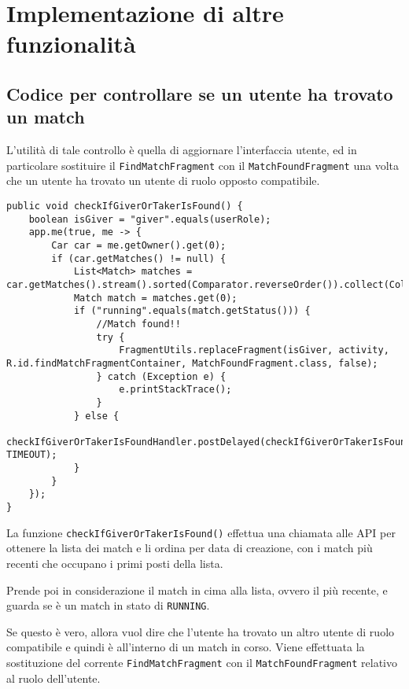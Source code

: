 \hypertarget{implementazione}{%
\chapter{Implementazione di altre funzionalità}\label{capitolo-3---implementazione}}

\hypertarget{codice-per-controllare-se-un-utente-ha-trovato-un-match}{%
\section{Codice per controllare se un utente ha trovato un
match}\label{codice-per-controllare-se-un-utente-ha-trovato-un-match}}

L'utilità di tale controllo è quella di aggiornare l'interfaccia utente,
ed in particolare sostituire il \texttt{FindMatchFragment} con il
\texttt{MatchFoundFragment} una volta che un utente ha trovato un utente di ruolo opposto compatibile.

\begin{lstlisting}[caption=Controllo per vedere se l'utente è in un match o meno]
public void checkIfGiverOrTakerIsFound() {
    boolean isGiver = "giver".equals(userRole);
    app.me(true, me -> {
        Car car = me.getOwner().get(0);
        if (car.getMatches() != null) {
            List<Match> matches = car.getMatches().stream().sorted(Comparator.reverseOrder()).collect(Collectors.toList());
            Match match = matches.get(0);
            if ("running".equals(match.getStatus())) {
                //Match found!!
                try {
                    FragmentUtils.replaceFragment(isGiver, activity, R.id.findMatchFragmentContainer, MatchFoundFragment.class, false);
                } catch (Exception e) {
                    e.printStackTrace();
                }
            } else {
                checkIfGiverOrTakerIsFoundHandler.postDelayed(checkIfGiverOrTakerIsFoundRunnable, TIMEOUT);
            }
        }
    });
}
\end{lstlisting}

La funzione \texttt{checkIfGiverOrTakerIsFound()} effettua una chiamata
alle API per ottenere la lista dei match e li ordina per data di
creazione, con i match più recenti che occupano i primi posti della
lista.

Prende poi in considerazione il match in cima alla lista, ovvero il più
recente, e guarda se è un match in stato di \texttt{RUNNING}.

Se questo è vero, allora vuol dire che l'utente ha trovato un altro
utente di ruolo compatibile e quindi è all'interno di un match in corso.
Viene effettuata la sostituzione del corrente \texttt{FindMatchFragment}
con il \texttt{MatchFoundFragment} relativo al ruolo dell'utente.

